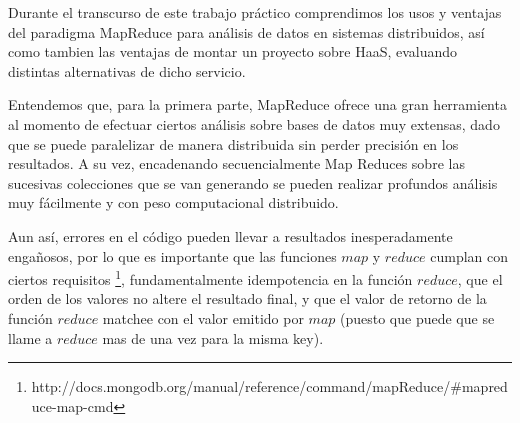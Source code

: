 Durante el transcurso de este trabajo pr\'actico comprendimos los usos y ventajas del paradigma MapReduce para an\'alisis de datos en sistemas distribuidos, 
as\'i como tambien las ventajas de montar un proyecto sobre HaaS, evaluando distintas alternativas de dicho servicio.


Entendemos que, para la primera parte, MapReduce ofrece una gran herramienta al momento de efectuar ciertos an\'alisis sobre 
bases de datos muy extensas, dado que se puede paralelizar de manera distribuida sin perder precisi\'on en los resultados. A su vez, 
encadenando secuencialmente Map Reduces sobre las sucesivas colecciones que se van generando se pueden realizar profundos an\'alisis 
muy f\'acilmente y con peso computacional distribuido.


Aun as\'i, errores en el c\'odigo pueden llevar a resultados inesperadamente engañosos, 
por lo que es importante que las funciones $map$ y $reduce$ cumplan con ciertos requisitos \footnote{http://docs.mongodb.org/manual/reference/command/mapReduce/\#mapreduce-map-cmd}, 
fundamentalmente idempotencia en la funci\'on $reduce$, que el orden de los valores no altere el resultado final, y que el valor de retorno 
de la funci\'on $reduce$ matchee con el valor emitido por $map$ (puesto que puede que se llame a $reduce$ mas de una vez para la misma key).


